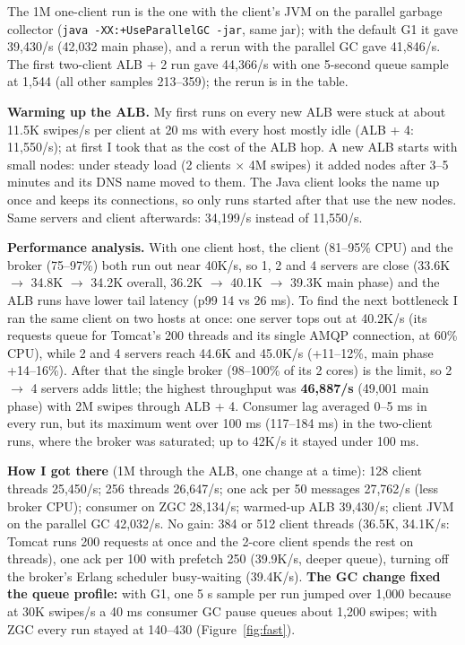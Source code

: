 \documentclass[10pt]{article}
\begin{document}
The 1M one-client run is the one with the client's JVM on the parallel garbage collector (\texttt{java -XX:+UseParallelGC -jar}, same jar); with the default G1 it gave 39,430/s (42,032 main phase), and a rerun with the parallel GC gave 41,846/s. The first two-client ALB + 2 run gave 44,366/s with one 5-second queue sample at 1,544 (all other samples 213--359); the rerun is in the table.

\textbf{Warming up the ALB.} My first runs on every new ALB were stuck at about 11.5K swipes/s per client at 20 ms with every host mostly idle (ALB + 4: 11,550/s); at first I took that as the cost of the ALB hop. A new ALB starts with small nodes: under steady load (2 clients $\times$ 4M swipes) it added nodes after 3--5 minutes and its DNS name moved to them. The Java client looks the name up once and keeps its connections, so only runs started after that use the new nodes. Same servers and client afterwards: 34,199/s instead of 11,550/s.

\textbf{Performance analysis.} With one client host, the client (81--95\% CPU) and the broker (75--97\%) both run out near 40K/s, so 1, 2 and 4 servers are close (33.6K $\to$ 34.8K $\to$ 34.2K overall, 36.2K $\to$ 40.1K $\to$ 39.3K main phase) and the ALB runs have lower tail latency (p99 14 vs 26 ms). To find the next bottleneck I ran the same client on two hosts at once: one server tops out at 40.2K/s (its requests queue for Tomcat's 200 threads and its single AMQP connection, at 60\% CPU), while 2 and 4 servers reach 44.6K and 45.0K/s (+11--12\%, main phase +14--16\%). After that the single broker (98--100\% of its 2 cores) is the limit, so 2 $\to$ 4 servers adds little; the highest throughput was \textbf{46,887/s} (49,001 main phase) with 2M swipes through ALB + 4. Consumer lag averaged 0--5 ms in every run, but its maximum went over 100 ms (117--184 ms) in the two-client runs, where the broker was saturated; up to 42K/s it stayed under 100 ms.

\textbf{How I got there} (1M through the ALB, one change at a time): 128 client threads 25,450/s; 256 threads 26,647/s; one ack per 50 messages 27,762/s (less broker CPU); consumer on ZGC 28,134/s; warmed-up ALB 39,430/s; client JVM on the parallel GC 42,032/s. No gain: 384 or 512 client threads (36.5K, 34.1K/s: Tomcat runs 200 requests at once and the 2-core client spends the rest on threads), one ack per 100 with prefetch 250 (39.9K/s, deeper queue), turning off the broker's Erlang scheduler busy-waiting (39.4K/s). \textbf{The GC change fixed the queue profile:} with G1, one 5 s sample per run jumped over 1,000 because at 30K swipes/s a 40 ms consumer GC pause queues about 1,200 swipes; with ZGC every run stayed at 140--430 (Figure~\ref{fig:fast}).
\end{document}
